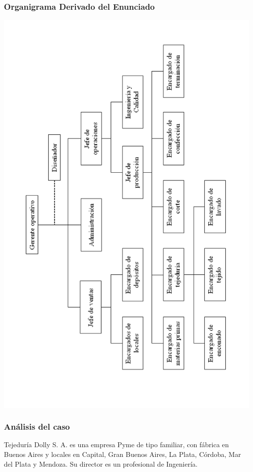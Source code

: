 \documentclass[a4paper,10pt,titlepage]{article}
\begin{document}
\subsubsection{Organigrama Derivado del Enunciado}
	\begin{center}
	\includegraphics[width=450pt]{./DollyOrnigrama.png}
	\end{center}

\subsubsection{An\'{a}lisis del caso}

	Tejedur\'{i}a Dolly S. A. es una empresa Pyme de tipo familiar, con f\'{a}brica en Buenos Aires y locales en Capital, 
	Gran Buenos Aires, La Plata, C\'{o}rdoba, Mar del Plata y Mendoza. Su director es un profesional de Ingenier\'{i}a.\\
	
\end{document}
